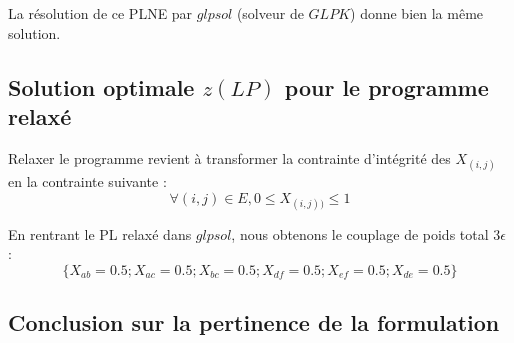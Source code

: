 La résolution de ce PLNE par $glpsol$ (solveur de $GLPK$) donne bien la même solution.

\subsection{Solution optimale $z(LP)$ pour le programme relaxé}
Relaxer le programme revient à transformer la contrainte d'intégrité des $X_{(i,j)}$ en la contrainte suivante :
$$ \forall{(i,j) \in E},  0 \leq X_{(i,j))} \leq 1 $$

En rentrant le PL relaxé dans $glpsol$, nous obtenons le couplage de poids total $3\epsilon$ : $$\{X_{ab} = 0.5 ; X_{ac} = 0.5 ; X_{bc} = 0.5 ; X_{df} = 0.5 ; X_{ef} = 0.5 ; X_{de} = 0.5\}$$ 

\subsection{Conclusion sur la pertinence de la formulation}


